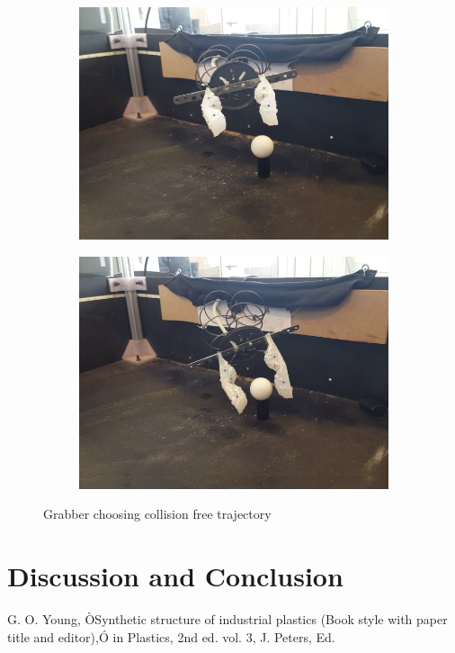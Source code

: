 \documentclass[letterpaper, 10 pt, conference]{ieeeconf}  %
\begin{document}
\begin{figure}[h!]
\begin{subfigure}[b]{0.72in}
                \includegraphics[width=\textwidth]{figures/path/g3.png}
        \end{subfigure}
        \begin{subfigure}[b]{0.72in}                            
                \centering
                \includegraphics[width=\textwidth]{figures/path/g4.png}
        \end{subfigure}
        \caption{Grabber choosing collision free trajectory}
        \label{fig:grabberpath}
\end{figure}

\section{Discussion and Conclusion}


\addtolength{\textheight}{-12cm}   


\begin{thebibliography}{99}

 G. O. Young, ÒSynthetic structure of industrial plastics (Book style with paper title and editor),Ó 	in Plastics, 2nd ed. vol. 3, J. Peters, Ed.  


\end{thebibliography}
\end{document}
